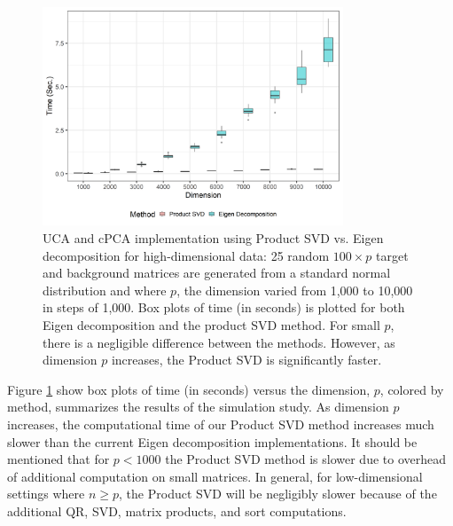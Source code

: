 \documentclass[12pt]{article}
\begin{document}
\begin{figure}[!ht]
    \label{fig:computational_perf}
    \centering
	\includegraphics[width = 0.8\textwidth]{figure/final_perf.png}
	\caption{UCA and cPCA implementation using Product SVD vs. Eigen decomposition for high-dimensional data: 25 random $100 \times p $ target and background matrices are generated from a standard normal distribution and where $p$, the dimension varied from 1,000 to 10,000 in steps of 1,000. Box plots of time (in seconds) is plotted for both Eigen decomposition and the product SVD method. For small $p$, there is a negligible difference between the methods. However, as dimension $p$ increases, the Product SVD is significantly faster.}
\end{figure}

Figure \ref{fig:computational_perf} show box plots of time (in seconds) versus the dimension, $p$, colored by method, summarizes the results of the simulation study. As dimension $p$ increases, the computational time of our Product SVD method increases much slower than the current Eigen decomposition implementations. It should be mentioned that for $p < 1000$ the Product SVD method is slower due to overhead of additional computation on small matrices. In general, for low-dimensional settings where $n \geq p$, the Product SVD will be negligibly slower because of the additional QR, SVD, matrix products, and sort computations. 

 
\end{document}
